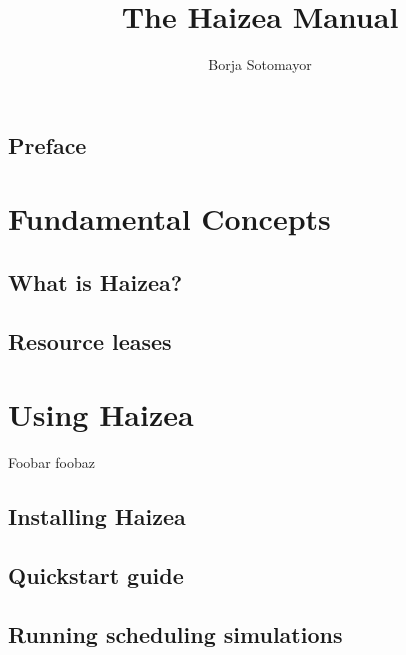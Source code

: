 \documentclass[a4paper,11pt]{scrbook}
\begin{document}
\frontmatter
\title{The Haizea Manual}
\author{Borja Sotomayor}

\begin{latexonly}

\end{latexonly}
\begin{htmlonly}
\maketitle
\end{htmlonly}


\tableofcontents

\chapter{Preface}


\mainmatter

\part{Fundamental Concepts}

\chapter{What is Haizea?}

\chapter{Resource leases}


\part{Using Haizea}

Foobar foobaz 

\chapter{Installing Haizea}



\chapter{Quickstart guide}



\chapter{Running scheduling simulations}
\end{document}
